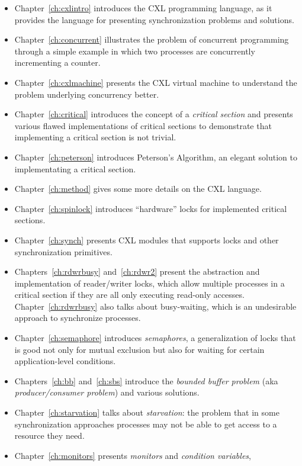 \documentclass{report}
\begin{document}
\begin{itemize}
\item Chapter~\ref{ch:cxlintro} introduces the CXL programming
language, as it provides the language for presenting synchronization
problems and solutions.
\item Chapter~\ref{ch:concurrent} illustrates the problem of
concurrent programming through a simple example in which two processes
are concurrently incrementing a counter.
\item Chapter~\ref{ch:cxlmachine} presents the
CXL virtual machine to understand the problem
underlying concurrency better.
\item Chapter~\ref{ch:critical} introduces the concept of a
\emph{critical section} and presents various flawed implementations
of critical sections to demonstrate that implementing a critical section
is not trivial.
\item Chapter~\ref{ch:peterson} introduces Peterson's Algorithm, an
elegant solution to implementating a critical section.
\item Chapter~\ref{ch:method} gives some more details on the CXL
language.
\item Chapter~\ref{ch:spinlock} introduces ``hardware'' locks
for implemented critical sections.
\item Chapter~\ref{ch:synch} presents CXL modules
that supports locks and other synchronization primitives.
\item Chapters~\ref{ch:rdwrbusy} and~\ref{ch:rdwr2} present the
abstraction and implementation of reader/writer
locks, which allow multiple processes in a critical section if they are
all only executing read-only accesses.
Chapter~\ref{ch:rdwrbusy} also talks about busy-waiting, which is
an undesirable approach to synchronize processes.
\item Chapter~\ref{ch:semaphore} introduces \emph{semaphores},
a generalization of locks
that is good not only for mutual exclusion but also for waiting for
certain application-level conditions.
\item Chapters~\ref{ch:bb} and~\ref{ch:sbs} introduce the
\emph{bounded buffer problem} (aka \emph{producer/consumer problem})
and various solutions.
\item Chapter~\ref{ch:starvation} talks about \emph{starvation}:
the problem that in some
synchronization approaches processes may not be able to get access to a
resource they need.
\item Chapter~\ref{ch:monitors} presents
\emph{monitors} and \emph{condition variables},

\end{itemize}
\end{document}
